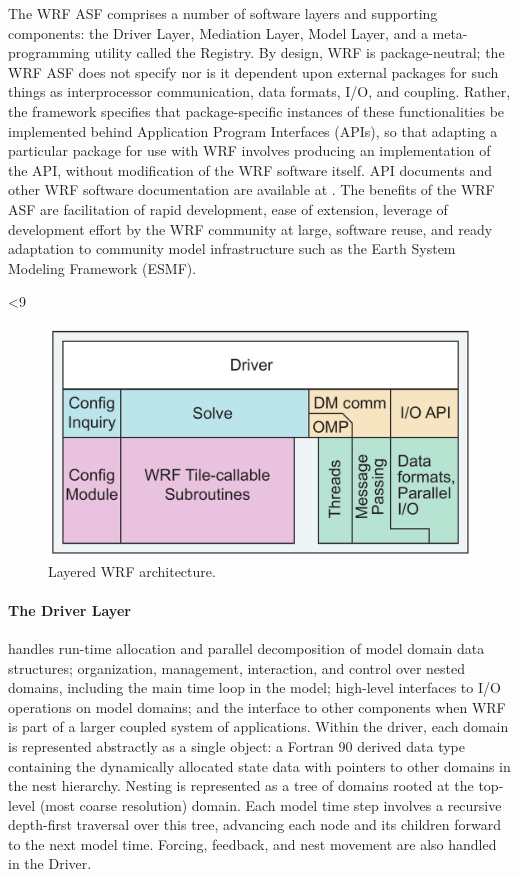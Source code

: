 The WRF ASF comprises a number of software layers and supporting
components: the Driver Layer, Mediation Layer, Model Layer, and a
meta-programming utility called the Registry.  By design, WRF is
package-neutral; the WRF ASF does not specify nor is it dependent upon
external packages for such things as interprocessor communication, data
formats, I/O, and coupling. Rather, the framework specifies that
package-specific instances of these functionalities be implemented
behind Application Program Interfaces (APIs), so that adapting a
particular package for use with WRF involves producing an
implementation of the API, without modification of the WRF software
itself.  API documents and other WRF software documentation are
available at \citep{sasi}.  The
benefits of the WRF ASF are facilitation of rapid development, ease of
extension, leverage of development effort by the WRF community at
large, software reuse, and ready adaptation to community model
infrastructure such as the Earth System Modeling Framework (ESMF).

%
%
\ifnum{}<9
\begin{figure}
  \centering
  \includegraphics[width=6.5in]{figures/layout.pdf}
  \caption{\label{figure:5a}Layered WRF architecture.}
\end{figure}
\fi

\paragraph{The Driver Layer} 
handles run-time allocation and parallel decomposition
of model domain data structures; organization, management, interaction,
and control over nested domains, including the main time loop in the
model; high-level interfaces to I/O operations on model domains; and
the interface to other components when WRF is part of a larger coupled
system of applications.  Within the driver, each domain is represented
abstractly as a single object: a Fortran 90  derived data type containing
the dynamically allocated state data with pointers to other domains in
the nest hierarchy. Nesting is represented as a tree of domains rooted
at the top-level (most coarse resolution) domain. Each model time step
involves a recursive depth-first traversal over this tree, advancing
each node and its children forward to the next model time. Forcing,
feedback, and nest movement are also handled in the Driver.

